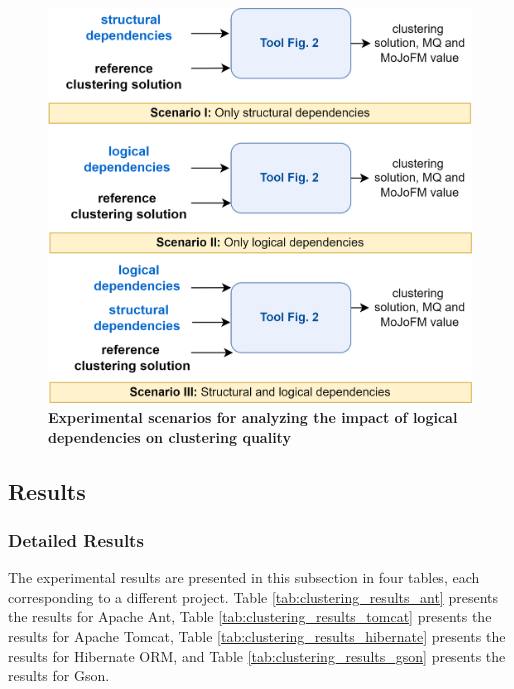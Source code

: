 \documentclass{ieeeaccess}
\begin{document}
\begin{figure}[t!]
  \centering
  \includegraphics[width=\columnwidth]{scenario.png}
  \caption{ \textbf{Experimental scenarios for analyzing the impact of logical dependencies on clustering quality}}
  \label{fig:scenatrio}
\end{figure}

\subsection{Results}
\label{subsec:results}

\subsubsection{Detailed Results}

The experimental results are presented in this subsection in four tables, each corresponding to a different project. Table \ref{tab:clustering_results_ant} presents the results for Apache Ant, Table \ref{tab:clustering_results_tomcat} presents the results for Apache Tomcat, Table \ref{tab:clustering_results_hibernate} presents the results for Hibernate ORM, and Table \ref{tab:clustering_results_gson} presents the results for Gson.
\end{document}
